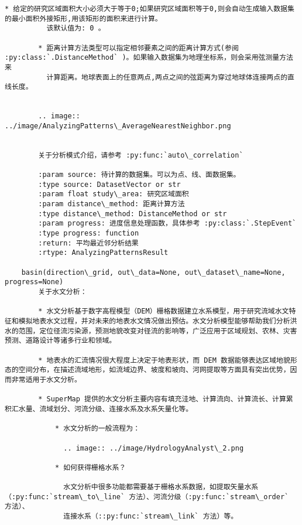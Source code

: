 \documentclass[11pt]{article}
\begin{document}
\begin{Verbatim}[commandchars=\\\{\}]
        * 给定的研究区域面积大小必须大于等于0;如果研究区域面积等于0,则会自动生成输入数据集的最小面积外接矩形,用该矩形的面积来进行计算。
          该默认值为: 0 。
        
        * 距离计算方法类型可以指定相邻要素之间的距离计算方式(参阅 :py:class:`.DistanceMethod` )。如果输入数据集为地理坐标系，则会采用弦测量方法来
          计算距离。地球表面上的任意两点,两点之间的弦距离为穿过地球体连接两点的直线长度。
        
        
        .. image:: ../image/AnalyzingPatterns\_AverageNearestNeighbor.png
        
        
        关于分析模式介绍，请参考 :py:func:`auto\_correlation`
        
        :param source: 待计算的数据集。可以为点、线、面数据集。
        :type source: DatasetVector or str
        :param float study\_area: 研究区域面积
        :param distance\_method: 距离计算方法
        :type distance\_method: DistanceMethod or str
        :param progress: 进度信息处理函数，具体参考 :py:class:`.StepEvent`
        :type progress: function
        :return: 平均最近邻分析结果
        :rtype: AnalyzingPatternsResult
    
    basin(direction\_grid, out\_data=None, out\_dataset\_name=None, progress=None)
        关于水文分析：
        
        * 水文分析基于数字高程模型（DEM）栅格数据建立水系模型，用于研究流域水文特征和模拟地表水文过程，并对未来的地表水文情况做出预估。水文分析模型能够帮助我们分析洪水的范围，定位径流污染源，预测地貌改变对径流的影响等，广泛应用于区域规划、农林、灾害预测、道路设计等诸多行业和领域。
        
        * 地表水的汇流情况很大程度上决定于地表形状，而 DEM 数据能够表达区域地貌形态的空间分布，在描述流域地形，如流域边界、坡度和坡向、河网提取等方面具有突出优势，因而非常适用于水文分析。
        
        * SuperMap 提供的水文分析主要内容有填充洼地、计算流向、计算流长、计算累积汇水量、流域划分、河流分级、连接水系及水系矢量化等。
        
            * 水文分析的一般流程为：
        
              .. image:: ../image/HydrologyAnalyst\_2.png
        
            * 如何获得栅格水系？
        
              水文分析中很多功能都需要基于栅格水系数据，如提取矢量水系（:py:func:`stream\_to\_line` 方法）、河流分级（:py:func:`stream\_order` 方法）、
              连接水系（::py:func:`stream\_link` 方法）等。
        

\end{Verbatim}
\end{document}
